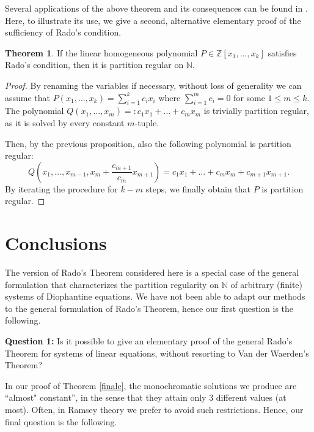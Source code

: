 \documentclass[a4paper,oneside]{article}
\newcommand{\N}{\mathbb{N}}
\newcommand{\Z}{\mathbb{Z}}
\theoremstyle{definition}
\newtheorem{theorem}{Theorem}[section]
\theoremstyle{named}
\begin{document}
Several applications of the above theorem and its consequences
can be found in \cite{dlb}.
Here, to illustrate its use, we give a second, alternative 
elementary proof of the sufficiency of Rado's condition. 

\begin{theorem}\label{finale2}
If the linear homogeneous polynomial $P\in\Z[x_1,\ldots,x_k]$ 
satisfies Rado's condition, then it is partition regular on $\N$.
\end{theorem}

\begin{proof}
By renaming the variables if necessary, without loss of generality we can assume 
that $P(x_1,\ldots,x_k)=\sum_{i=1}^{k}c_i x_i$ 
where $\sum_{i=1}^m c_i=0$ for some $1\le m\le k$.
The polynomial $Q(x_1,\ldots,x_m)=:c_1x_1+\ldots+c_m x_m$ is trivially partition regular, 
as it is solved by every constant $m$-tuple.

Then, by the previous proposition, also the following polynomial is partition regular:
$$Q\left(x_1,\ldots,x_{m-1},x_m+\frac{c_{m+1}}{c_m}x_{m+1}\right)=
c_1x_1+\ldots+c_m x_m+c_{m+1}x_{m+1}.$$
By iterating the procedure for $k-m$ steps, we finally
obtain that $P$ is partition regular.
\end{proof}



\medskip
\section{Conclusions}\label{conclusions}

The version of Rado's Theorem considered here is a special case of 
the general formulation that characterizes the partition regularity on $\N$ of 
arbitrary (finite) systems of Diophantine equations. 
We have not been able to adapt our methods to the general formulation 
of Rado's Theorem, hence our first question is the following.

\medskip
{\bfseries Question 1:} 
Is it possible to give an elementary proof of the general Rado's Theorem 
for systems of linear equations, without resorting to Van der Waerden's Theorem?

\smallskip

In our proof of Theorem \ref{finale}, the monochromatic solutions we produce are ``almost"
constant'', in the sense that they attain only 3 different values (at most). 
Often, in Ramsey theory we prefer to avoid such restrictions. Hence, our final question is the following.
\end{document}
